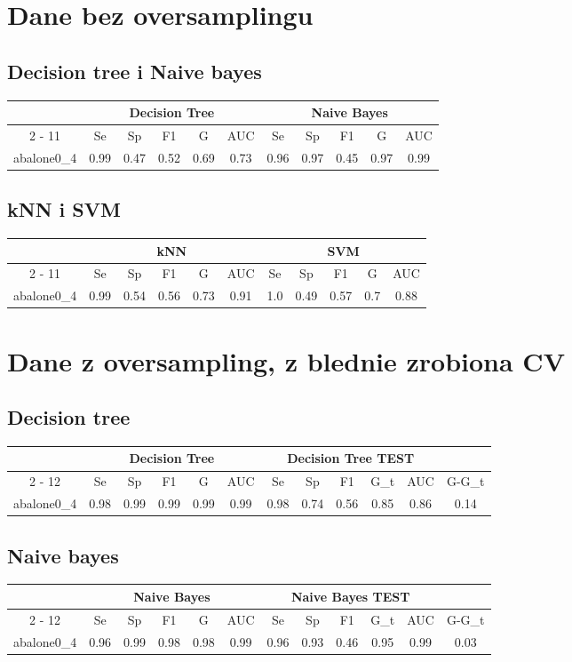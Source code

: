 \documentclass{article}%
\begin{document}
%
\normalsize%
\section*{Dane bez oversamplingu}%
\subsection*{Decision tree i Naive bayes}%
\begin{tabular}{|c|c|c|c|c|c|c|c|c|c|c|}%
\hline%
&\multicolumn{5}{|c|}{Decision Tree}&\multicolumn{5}{|c|}{Naive Bayes}\\%
\cline{2%
-%
11}%
&Se&Sp&F1&G&AUC&Se&Sp&F1&G&AUC\\%
\hline%
abalone0\_4&0.99&0.47&0.52&0.69&0.73&0.96&0.97&0.45&0.97&0.99\\%
\hline%
\end{tabular}

%
\subsection*{kNN i SVM}%
\begin{tabular}{|c|c|c|c|c|c|c|c|c|c|c|}%
\hline%
&\multicolumn{5}{|c|}{kNN}&\multicolumn{5}{|c|}{SVM}\\%
\cline{2%
-%
11}%
&Se&Sp&F1&G&AUC&Se&Sp&F1&G&AUC\\%
\hline%
abalone0\_4&0.99&0.54&0.56&0.73&0.91&1.0&0.49&0.57&0.7&0.88\\%
\hline%
\end{tabular}

%
\section*{Dane z oversampling, z blednie zrobiona CV}%
\subsection*{Decision tree}%
\begin{tabular}{|c|c|c|c|c|c|c|c|c|c|c|c|}%
\hline%
&\multicolumn{5}{|c|}{Decision Tree}&\multicolumn{5}{|c|}{Decision Tree TEST}&\\%
\cline{2%
-%
12}%
&Se&Sp&F1&G&AUC&Se&Sp&F1&G\_t&AUC&G{-}G\_t\\%
\hline%
abalone0\_4&0.98&0.99&0.99&0.99&0.99&0.98&0.74&0.56&0.85&0.86&0.14\\%
\hline%
\end{tabular}

%
\subsection*{Naive bayes}%
\begin{tabular}{|c|c|c|c|c|c|c|c|c|c|c|c|}%
\hline%
&\multicolumn{5}{|c|}{Naive Bayes}&\multicolumn{5}{|c|}{Naive Bayes TEST}&\\%
\cline{2%
-%
12}%
&Se&Sp&F1&G&AUC&Se&Sp&F1&G\_t&AUC&G{-}G\_t\\%
\hline%
abalone0\_4&0.96&0.99&0.98&0.98&0.99&0.96&0.93&0.46&0.95&0.99&0.03\\%
\hline%
\end{tabular}
\end{document}
